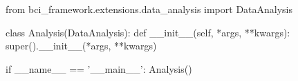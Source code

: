 \begin{python}
from bci_framework.extensions.data_analysis import DataAnalysis

class Analysis(DataAnalysis):
    def __init__(self, *args, **kwargs):
        super().__init__(*args, **kwargs)

if __name__ == '__main__':
    Analysis()
\end{python}